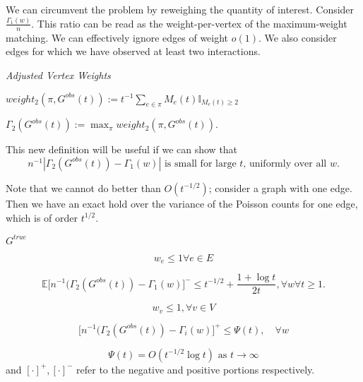 We can circumvent the problem by reweighing the quantity of interest.  Consider $\frac{\Gamma_1(w)}{n}$.  This ratio can be read as the weight-per-vertex of the maximum-weight matching.  We can effectively ignore edges of weight $o(1)$.  We also consider edges for which we have observed at least two interactions.  

\begin{definition}\textit{Adjusted Vertex Weights}

\begin{center}

$weight_2 (\pi, G^{obs}(t)):= t^{-1}\sum_{e \in \pi}M_e(t)\mathbb{I}_{M_e(t) \geq 2}$\\
\bigskip


$\Gamma_2(G^{obs}(t)):= \max_{\pi} weight_2 (\pi, G^{obs}(t))$.

\end{center}
\end{definition}



This new definition will be useful if we can show that 
\begin{equation}
n^{-1}|\Gamma_2(G^{obs}(t)) - \Gamma_1(w)| \text{ is small for large } t \text{, uniformly over all } w.
\end{equation}

Note that we cannot do better than $O(t^{-1/2})$;  consider a graph with one edge.  Then we have an exact hold over the variance of the Poisson counts for one edge, which is of order $t^{1/2}$.  



\begin{prop}
 $G^{true}$  

\begin{equation}
w_e \leq 1 \forall e \in E
\end{equation}

\begin{equation}
\mathbb{E}\bigg[n^{-1}(\Gamma_2(G^{obs}(t))-\Gamma_1(w)\bigg]^- \leq t^{-1/2} + \frac{1+\log t}{2 t},  \forall w \forall t \geq 1.
\end{equation} 


\begin{equation}
w_v \leq 1, \forall v \in V
\end{equation}


\begin{equation}
\bigg[n^{-1}(\Gamma_2(G^{obs}(t))-\Gamma_i(w)\bigg]^{+} \leq \Psi(t),  \quad \forall w
\end{equation}


\begin{equation}
\Psi(t) = O(t^{-1/2}\log t) \text{ as } t \rightarrow \infty
\end{equation} and $[\cdot]^+, [\cdot ]^-$ refer to the negative and positive portions respectively. 
\end{prop}


